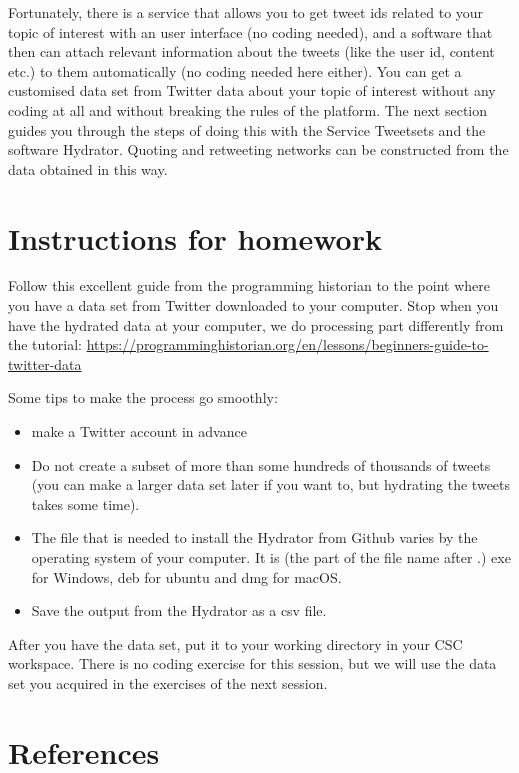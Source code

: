 \documentclass[
]{book}
\providecommand{\tightlist}{%
  \setlength{\itemsep}{0pt}\setlength{\parskip}{0pt}}
\begin{document}
Fortunately, there is a service that allows you to get tweet ids related to your topic of interest with an user interface (no coding needed), and a software that then can attach relevant information about the tweets (like the user id, content etc.) to them automatically (no coding needed here either). You can get a customised data set from Twitter data about
your topic of interest without any coding at all and without breaking the rules of the platform. The next section guides you through the steps of doing this with the Service Tweetsets and the software Hydrator. Quoting and retweeting networks can be constructed from the data obtained in this way.

\hypertarget{instructions-for-homework}{%
\section{Instructions for homework}\label{instructions-for-homework}}

Follow this excellent guide from the programming historian to the point where you have a data set from Twitter downloaded to your computer.
Stop when you have the hydrated data at your computer, we do processing part differently from the tutorial:
\url{https://programminghistorian.org/en/lessons/beginners-guide-to-twitter-data}

Some tips to make the process go smoothly:

\begin{itemize}
\tightlist
\item
  make a Twitter account in advance
\item
  Do not create a subset of more than some hundreds of thousands of tweets (you can make a larger data set later if you want to, but hydrating the tweets takes some time).
\item
  The file that is needed to install the Hydrator from Github varies by the operating system of your computer. It is (the part of the file name after .) exe for Windows, deb for ubuntu and dmg for macOS.
\item
  Save the output from the Hydrator as a csv file.
\end{itemize}

After you have the data set, put it to your working directory in your CSC workspace. There is no coding exercise for this session,
but we will use the data set you acquired in the exercises of the next session.

\hypertarget{references}{%
\section{References}\label{references}}
\end{document}
